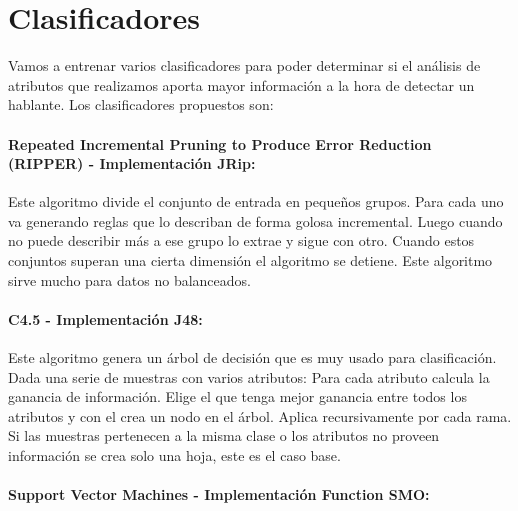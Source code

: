 \documentclass[11pt,a4paper,twoside]{tesis}
\begin{document}
\section{Clasificadores}

Vamos a entrenar varios clasificadores para poder determinar si el análisis de atributos que realizamos aporta mayor información a la hora de detectar un hablante. Los clasificadores propuestos son: 

\paragraph{Repeated Incremental Pruning to Produce Error Reduction (RIPPER) \cite{Cohen1995} - Implementación JRip:}


Este algoritmo divide el conjunto de entrada en pequeños grupos. Para cada uno va generando reglas que lo describan de forma golosa incremental. Luego cuando no puede describir más a ese grupo lo extrae y sigue con otro. Cuando estos conjuntos superan una cierta dimensión el algoritmo se detiene. Este algoritmo sirve mucho para datos no balanceados.

\paragraph{C4.5 \cite{Quinlan1993} - Implementación J48:}


Este algoritmo genera un árbol de decisión que es muy usado para clasificación. Dada una serie de muestras con varios atributos: Para cada atributo calcula la ganancia de información. Elige el que tenga mejor ganancia entre todos los atributos y con el crea un nodo en el árbol. Aplica recursivamente por cada rama. Si las muestras pertenecen a la misma clase o los atributos no proveen información se crea solo una hoja, este es el caso base.

\paragraph{Support Vector Machines \cite{Platt98sequentialminimal} - Implementación Function SMO:}
\end{document}

